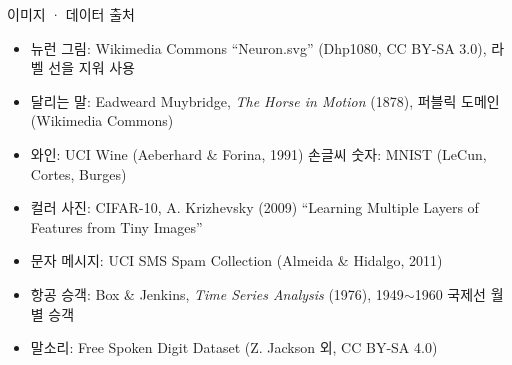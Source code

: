 \documentclass[aspectratio=169,11pt]{beamer}
\begin{document}
\begin{frame}{이미지 · 데이터 출처}
\vfill
\small
\begin{itemize}
\item 뉴런 그림: Wikimedia Commons ``Neuron.svg'' (Dhp1080, CC BY-SA 3.0), 라벨 선을 지워 사용
\item 달리는 말: Eadweard Muybridge, \textit{The Horse in Motion} (1878), 퍼블릭 도메인 (Wikimedia Commons)
\item 와인: UCI Wine (Aeberhard \& Forina, 1991) \quad 손글씨 숫자: MNIST (LeCun, Cortes, Burges)
\item 컬러 사진: CIFAR-10, A. Krizhevsky (2009) ``Learning Multiple Layers of Features from Tiny Images''
\item 문자 메시지: UCI SMS Spam Collection (Almeida \& Hidalgo, 2011)
\item 항공 승객: Box \& Jenkins, \textit{Time Series Analysis} (1976), 1949$\sim$1960 국제선 월별 승객
\item 말소리: Free Spoken Digit Dataset (Z. Jackson 외, CC BY-SA 4.0)
\end{itemize}
\vfill
{}
\end{frame}
\end{document}
